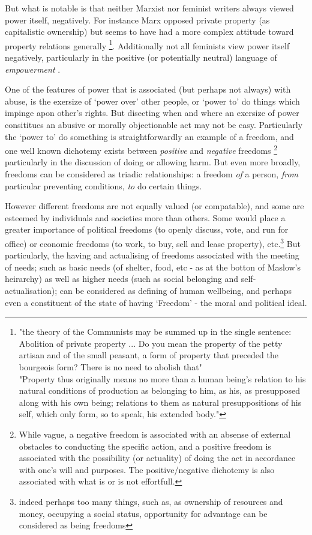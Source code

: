 But what is notable is that neither Marxist nor feminist writers always viewed power itself, negatively.
For instance Marx opposed private property (as capitalistic ownership) but seems to have had a more complex attitude toward property relations generally \footnote{"the theory of the Communists may be summed up in the single sentence: Abolition of private property ... Do you mean the property of the petty artisan and of the small peasant, a form of property that preceded the bourgeois form? There is no need to abolish that"\cite{MarxGutenberg}\\"Property thus originally means no more than a human being's relation to his natural conditions of production as belonging to him, as his, as presupposed along with his own being; relations to them as natural presuppositions of his self, which only form, so to speak, his extended body."\cite{marx_capital_I}}.
Additionally not all feminists view power itself negatively, particularly in the positive (or potentially neutral) language of \textit{empowerment} \cite{doi:10.1111/j.1527-2001.1998.tb01350.x}.

One of the features of power that is associated (but perhaps not always) with abuse, is the exersize of `power over' other people, or `power to' do things which impinge apon other's rights.\cite{doi:10.1111/j.1527-2001.1998.tb01350.x}
But disecting when and where an exersize of power consititues an abusive or morally objectionable act may not be easy.
Particularly the `power to' do something is straightforwardly an example of a freedom, and one well known dichotemy exists between \textit{positive} and \textit{negative} freedoms
\footnote{While vague, a negative freedom is associated with an absense of external obstacles to conducting the specific action, and a positive freedom is associated with the possibility (or actuality) of doing the act in accordance with one's will and purposes. The positive/negative dichotemy is also associated with what is or is not effortfull.\cite{Mossel2009-MOSNA}} particularly in the discussion of doing or allowing harm.
But even more broadly, freedoms can be considered as triadic relationships: a freedom \textit{of} a person, \textit{from} particular preventing conditions, \textit{to} do certain things.\cite{Negative_and_Positive_Freedom}

However different freedoms are not equally valued (or compatable), and some are esteemed by individuals and societies more than others.
Some would place a greater importance of political freedoms (to openly discuss, vote, and run for office) or economic freedoms (to work, to buy, sell and lease property), etc.\footnote{indeed perhaps too many things, such as, as ownership of resources and money, occupying a social status, opportunity for advantage can be considered as being freedoms}
But particularly, the having and actualising of freedoms associated with the meeting of needs; such as basic needs (of shelter, food, etc - as at the botton of Maslow's heirarchy) as well as higher needs (such as social belonging and self-actualisation); can be considered as defining of human wellbeing, and perhaps even a constituent of the state of having `Freedom' - the moral and political ideal.

